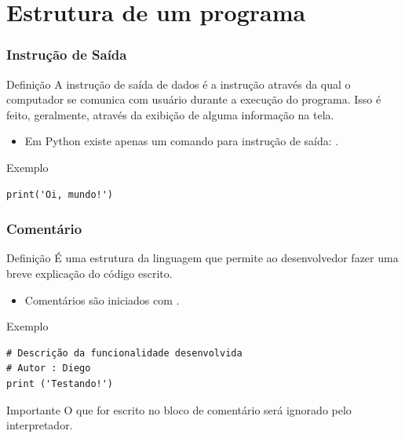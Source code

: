 \documentclass[aspectratio=169]{beamer} %
\begin{document}
\section{Estrutura de um programa}

\begin{frame}[fragile]
\frametitle{Instrução de Saída}

\begin{block}{Definição}
	A instrução de saída de dados é a instrução através da qual o computador se comunica com usuário durante a execução do programa. Isso é feito, geralmente, através da exibição de alguma informação na tela.
\end{block}\vfill

\begin{itemize}
	\item Em Python existe apenas um comando para instrução de saída: .
\end{itemize}\vfill

\begin{exampleblock}{Exemplo}
\begin{lstlisting}
print('Oi, mundo!')
\end{lstlisting}
\end{exampleblock}
\end{frame}

\begin{frame}[fragile]
\frametitle{Comentário}

\begin{block}{Definição}
É uma estrutura da linguagem que permite ao desenvolvedor fazer uma breve explicação do código escrito.
\end{block}\vfill

\begin{itemize}
	\item Comentários são iniciados com \structure{\#}.
\end{itemize}\vfill

\begin{exampleblock}{Exemplo}
	\begin{lstlisting}
# Descrição da funcionalidade desenvolvida
# Autor : Diego
print ('Testando!')
	\end{lstlisting}
\end{exampleblock}\vfill

\begin{alertblock}{Importante}
O que for escrito no bloco de comentário será ignorado pelo interpretador.
\end{alertblock}
\end{frame}
\end{document}
